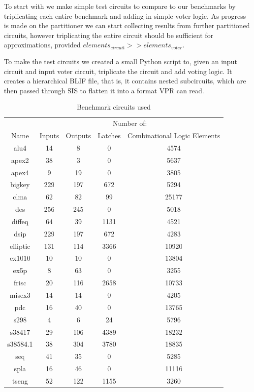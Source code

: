 \documentclass[12pt,drafta4paper,oneside]{memoir} %
\begin{document}
{To start with we make simple test circuits to compare to our benchmarks by triplicating each entire benchmark and adding in simple voter logic. As progress is made on the partitioner we can start collecting results from further partitioned circuits, however triplicating the entire circuit should be sufficient for approximations, provided $elements_{circuit} >> elements_{voter}$.

To make the test circuits we created a small Python script to, given an input circuit and input voter circuit, triplicate the circuit and add voting logic. It creates a hierarchical \ac{BLIF} file, that is, it contains nested subcircuits, which are then passed through \ac{SIS} to flatten it into a format \ac{VPR} can read.

\begin{table}
    \begin{tabular}{c|cccc}
     & \multicolumn{4}{c}{Number of:}\\
     Name & Inputs & Outputs & Latches & Combinational Logic Elements\\
        alu4 & 14 & 8 & 0 & 4574\\
        apex2 & 38 & 3 & 0 & 5637\\
        apex4 & 9 & 19 & 0 & 3805\\     
        bigkey & 229 & 197 & 672 & 5294\\
        clma & 62 & 82 & 99 & 25177\\
        des & 256 & 245 & 0 & 5018\\
        diffeq & 64 & 39 & 1131 & 4521\\
        dsip & 229 & 197 & 672 & 4283\\
        elliptic & 131 & 114 & 3366 & 10920\\
        ex1010 & 10 & 10 & 0 & 13804\\
        ex5p & 8 & 63 & 0 & 3255\\
        frisc & 20 & 116 & 2658 & 10733\\
        misex3 & 14 & 14 & 0 & 4205\\
        pdc & 16 & 40 & 0 & 13765\\
        s298     & 4 & 6 & 24 & 5796\\
        s38417   & 29 & 106 & 4389 & 18232\\
        s38584.1 & 38 & 304 & 3780 & 18835\\
        seq      & 41 & 35 & 0 & 5285\\
        spla     & 16 & 46 & 0 & 11116\\
        tseng    & 52 & 122 & 1155 & 3260
    \end{tabular}
    \caption{Benchmark circuits used}
    \label{benchmarkList}
\end{table}


}
\end{document}

